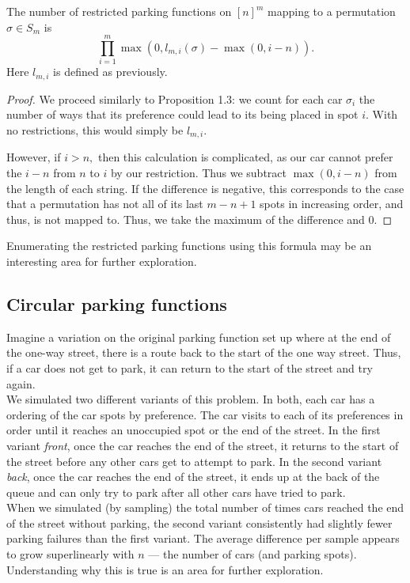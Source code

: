 \begin{proposition}
    The number of restricted parking functions on $[n]^m$ mapping to a permutation $\sigma\in S_m$ is
    \[
    \prod_{i=1}^m \max(0,l_{m,i}(\sigma)-\max(0,i-n)).
    \]
    Here $l_{m, i}$ is defined as previously.
\end{proposition}

\begin{proof}
    We proceed similarly to Proposition 1.3: we count for each car $\sigma_i$ the number of ways that its preference could lead to its being placed in spot $i.$ With no restrictions, this would simply be $l_{m,i}.$
    
    However, if $i>n,$ then this calculation is complicated, as our car cannot prefer the $i-n$ from $n$ to $i$ by our restriction. Thus we subtract $\max(0,i-n)$ from the length of each string. If the difference is negative, this corresponds to the case that a permutation has not all of its last $m - n + 1$ spots in increasing order, and thus, is not mapped to. Thus, we take the maximum of the difference and $0$.
\end{proof}

Enumerating the restricted parking functions using this formula may be an interesting area for further exploration.

\subsection*{Circular parking functions}

Imagine a variation on the original parking function set up where at the end of the one-way street, there is a route back to the start of the one way street. Thus, if a car does not get to park, it can return to the start of the street and try again. \\

We simulated two different variants of this problem. In both, each car has a ordering of the car spots by preference. The car visits to each of its preferences in order until it reaches an unoccupied spot or the end of the street. In the first variant \textit{front}, once the car reaches the end of the street, it returns to the start of the street before any other cars get to attempt to park. In the second variant \textit{back}, once the car reaches the end of the street, it ends up at the back of the queue and can only try to park after all other cars have tried to park. \\

When we simulated (by sampling) the total number of times cars reached the end of the street without parking, the second variant consistently had slightly fewer parking failures than the first variant. The average difference per sample appears to grow superlinearly with $n$ --- the number of cars (and parking spots). Understanding why this is true is an area for further exploration.
